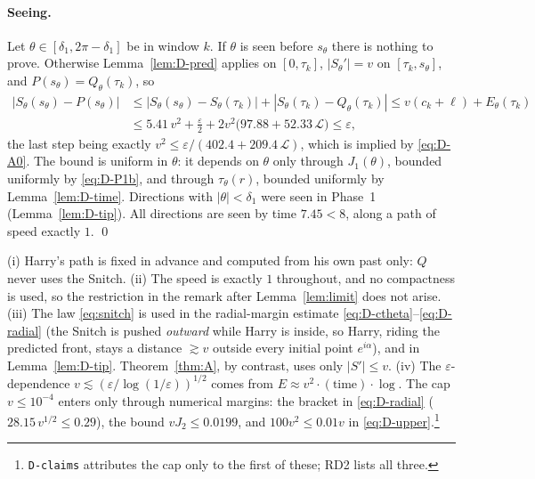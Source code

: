 \paragraph{Seeing.} Let $\theta\in[\delta_1,2\pi-\delta_1]$ be in window $k$. If $\theta$ is seen before $s_\theta$ there is
nothing to prove. Otherwise Lemma~\ref{lem:D-pred} applies on $[0,\tau_k]$, $|S_\theta'|=v$ on $[\tau_k,s_\theta]$, and
$P(s_\theta)=Q_\theta(\tau_k)$, so
\[
\begin{split}
|S_\theta(s_\theta)-P(s_\theta)|&\le|S_\theta(s_\theta)-S_\theta(\tau_k)|+|S_\theta(\tau_k)-Q_\theta(\tau_k)|
\le v(c_k+\ell)+E_\theta(\tau_k)\\
&\le5.41\,v^2+\frac{\varepsilon}{2}+2v^2\bigl(97.88+52.33\,\mathcal L\bigr)\le\varepsilon,
\end{split}
\]
the last step being exactly $v^2\le\varepsilon/(402.4+209.4\,\mathcal L)$, which is implied by \eqref{eq:D-A0}. The bound is
uniform in $\theta$: it depends on $\theta$ only through $J_1(\theta)$, bounded uniformly by \eqref{eq:D-P1b}, and through
$\tau_\theta(r)$, bounded uniformly by Lemma~\ref{lem:D-time}. Directions with $|\theta|<\delta_1$ were seen in Phase~1
(Lemma~\ref{lem:D-tip}). All directions are seen by time $7.45<8$, along a path of speed exactly $1$. \qed

\begin{remark}\label{rem:D1-remarks}
(i) Harry's path is fixed in advance and computed from his own past only: $Q$ never uses the Snitch.
(ii) The speed is exactly $1$ throughout, and no compactness is used, so the restriction in the remark after
Lemma~\ref{lem:limit} does not arise.
(iii) The law \eqref{eq:snitch} is used in the radial-margin estimate \eqref{eq:D-ctheta}--\eqref{eq:D-radial} (the Snitch is
pushed \emph{outward} while Harry is inside, so Harry, riding the predicted front, stays a distance $\gtrsim v$ outside every
initial point $e^{i\alpha}$), and in Lemma~\ref{lem:D-tip}. Theorem~\ref{thm:A}, by contrast, uses only $|S'|\le v$.
(iv) The $\varepsilon$-dependence $v\lesssim(\varepsilon/\log(1/\varepsilon))^{1/2}$ comes from
$E\approx v^2\cdot(\text{time})\cdot\log$. The cap $v\le10^{-4}$ enters only through numerical margins: the bracket in
\eqref{eq:D-radial} ($28.15\,v^{1/2}\le0.29$), the bound $vJ_2\le0.0199$, and $100v^2\le0.01v$ in
\eqref{eq:D-upper}.\footnote{\texttt{D-claims} attributes the cap only to the first of these; RD2 lists all three.}
\end{remark}

